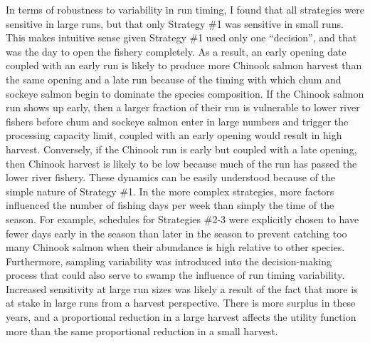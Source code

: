 \documentclass[12pt,]{book}
\theoremstyle{definition}
\theoremstyle{definition}
\theoremstyle{definition}
\theoremstyle{remark}
\begin{document}
In terms of robustness to variability in run timing, I found that all
strategies were sensitive in large runs, but that only Strategy \#1 was
sensitive in small runs. This makes intuitive sense given Strategy \#1
used only one ``decision'', and that was the day to open the fishery
completely. As a result, an early opening date coupled with an early run
is likely to produce more Chinook salmon harvest than the same opening
and a late run because of the timing with which chum and sockeye salmon
begin to dominate the species composition. If the Chinook salmon run
shows up early, then a larger fraction of their run is vulnerable to
lower river fishers before chum and sockeye salmon enter in large
numbers and trigger the processing capacity limit, coupled with an early
opening would result in high harvest. Conversely, if the Chinook run is
early but coupled with a late opening, then Chinook harvest is likely to
be low because much of the run has passed the lower river fishery. These
dynamics can be easily understood because of the simple nature of
Strategy \#1. In the more complex strategies, more factors influenced
the number of fishing days per week than simply the time of the season.
For example, schedules for Strategies \#2-3 were explicitly chosen to
have fewer days early in the season than later in the season to prevent
catching too many Chinook salmon when their abundance is high relative
to other species. Furthermore, sampling variability was introduced into
the decision-making process that could also serve to swamp the influence
of run timing variability. Increased sensitivity at large run sizes was
likely a result of the fact that more is at stake in large runs from a
harvest perspective. There is more surplus in these years, and a
proportional reduction in a large harvest affects the utility function
more than the same proportional reduction in a small harvest.
\end{document}
